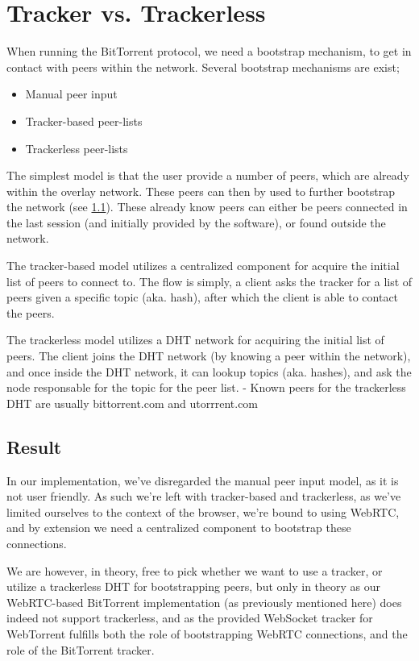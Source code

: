 \section{Tracker vs. Trackerless}

When running the BitTorrent protocol, we need a bootstrap mechanism, to get in
contact with peers within the network. Several bootstrap mechanisms are exist;
\begin{itemize}
\item Manual peer input
\item Tracker-based peer-lists
\item Trackerless peer-lists
\end{itemize}
The simplest model is that the user provide a number of peers, which are
already within the overlay network. These peers can then by used to further
bootstrap the network (see \ref{}). These already know peers can either be
peers connected in the last session (and initially provided by the software),
or found outside the network.

The tracker-based model utilizes a centralized component for acquire the
initial list of peers to connect to. The flow is simply, a client asks the
tracker for a list of peers given a specific topic (aka. hash), after which the
client is able to contact the peers.

The trackerless model utilizes a DHT network for acquiring the initial list of 
peers. The client joins the DHT network (by knowing a peer within the network),
and once inside the DHT network, it can lookup topics (aka. hashes), and ask
the node responsable for the topic for the peer list.
\newline
- Known peers for the trackerless DHT are usually bittorrent.com and utorrrent.com

\subsection{Result}
In our implementation, we've disregarded the manual peer input model, as it is
not user friendly. As such we're left with tracker-based and trackerless, as 
we've limited ourselves to the context of the browser, we're bound to using 
WebRTC, and by extension we need a centralized component to bootstrap these
connections. 

We are however, in theory, free to pick whether we want to use a tracker, or 
utilize a trackerless DHT for bootstrapping peers, but only in theory as our
WebRTC-based BitTorrent implementation (as previously mentioned here) does
indeed not support trackerless, and as the provided WebSocket tracker for 
WebTorrent fulfills both the role of bootstrapping WebRTC connections, and the
role of the BitTorrent tracker.

